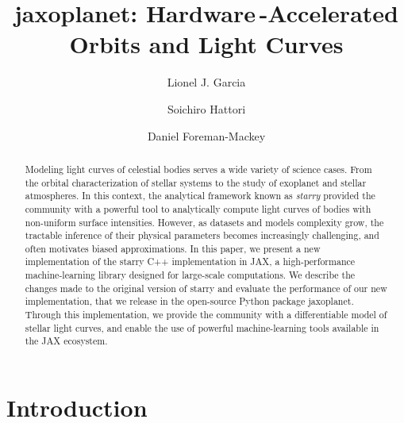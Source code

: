\documentclass[modern]{aastex631}
\begin{document}
\title{\textsf{jaxoplanet}: Hardware\,-Accelerated Orbits and Light Curves}

\author[0000-0002-4296-2246]{Lionel J. Garcia}
\author{Soichiro Hattori}
\author[0000-0002-9328-5652]{Daniel Foreman-Mackey}

\keywords{}

\begin{abstract}
    Modeling light curves of celestial bodies serves a wide variety of science cases. From the orbital characterization of stellar systems to the study of exoplanet and stellar atmospheres. In this context, the analytical framework known as \textit{starry} provided the community with a powerful tool to analytically compute light curves of bodies with non-uniform surface intensities. However, as datasets and models complexity grow, the tractable inference of their physical parameters becomes increasingly challenging, and often motivates biased approximations. In this paper, we present a new implementation of the \textsf{starry} C++ implementation in \textsf{JAX}, a high-performance machine-learning library designed for large-scale computations. We describe the changes made to the original version of \textsf{starry} and evaluate the performance of our new implementation, that we release in the open-source Python package \textsf{jaxoplanet}. Through this implementation, we provide the community with a differentiable model of stellar light curves, and enable the use of powerful machine-learning tools available in the \textsf{JAX} ecosystem. \gitlink{}
\end{abstract}

\section{Introduction}
\end{document}
